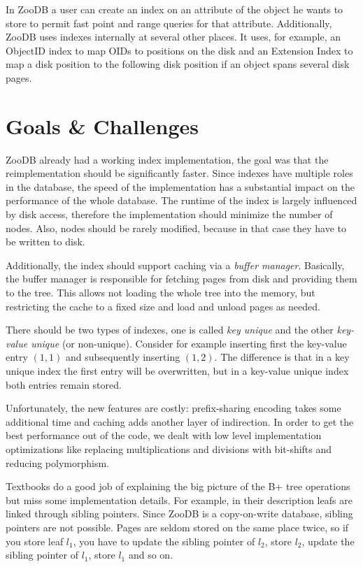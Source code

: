 \documentclass[11pt,a4paper,oneside]{article}
\begin{document}
In ZooDB a user can create an index on an attribute of the object he wants to store to permit fast point and range queries for that attribute.
Additionally, ZooDB uses indexes internally at several other places.
It uses, for example, an ObjectID index to map OIDs to positions on the disk and an Extension Index to map a disk position to the following disk position if an object spans several disk pages. 

\section{Goals \& Challenges}
ZooDB already had a working index implementation, the goal was that the reimplementation should be significantly faster. 
Since indexes have multiple roles in the database, the speed of the implementation has a substantial impact on the performance of the whole database.
The runtime of the index is largely influenced by disk access, therefore the implementation should minimize the number of nodes.
Also, nodes should be rarely modified, because in that case they have to be written to disk.

Additionally, the index should support caching via a \emph{buffer manager}. 
Basically, the buffer manager is responsible for fetching pages from disk and providing them to the tree.
This allows not loading the whole tree into the memory, but restricting the cache to a fixed size and load and unload pages as needed.

There should be two types of indexes, one is called \emph{key unique} and the other \emph{key-value unique} (or non-unique). 
Consider for example inserting first the key-value entry $(1,1)$ and subsequently inserting $(1,2)$.
The difference is that in a key unique index the first entry will be overwritten, but in a key-value unique index both entries remain stored. 

Unfortunately, the new features are costly: prefix-sharing encoding takes some additional time and caching adds another layer of indirection.
In order to get the best performance out of the code, we dealt with low level implementation optimizations like replacing multiplications and divisions with bit-shifts and reducing polymorphism.

Textbooks do a good job of explaining the big picture of the B+ tree operations but miss some implementation details.
For example, in their description leafs are linked through sibling pointers. Since ZooDB is a copy-on-write database, sibling pointers are not possible.
Pages are seldom stored on the same place twice, so if you store leaf $l_1$, you have to update the sibling pointer of $l_2$, store $l_2$, update the sibling pointer of $l_1$, store $l_1$ and so on.
\end{document}
